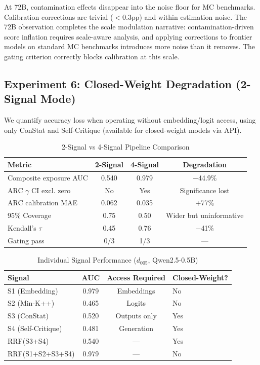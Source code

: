 \documentclass[11pt]{article}
\begin{document}
At 72B, contamination effects disappear into the noise floor for MC benchmarks. Calibration corrections are trivial ($< 0.3$pp) and within estimation noise. The 72B observation completes the scale modulation narrative: contamination-driven score inflation requires scale-aware analysis, and applying corrections to frontier models on standard MC benchmarks introduces more noise than it removes. The gating criterion correctly blocks calibration at this scale.

\subsection{Experiment 6: Closed-Weight Degradation (2-Signal Mode)}
\label{sec:closed}

We quantify accuracy loss when operating without embedding/logit access, using only ConStat and Self-Critique (available for closed-weight models via API).

\begin{table}[h]
\centering
\caption{2-Signal vs 4-Signal Pipeline Comparison}
\label{tab:2v4}
\begin{tabular}{lccc}
\toprule
Metric & 2-Signal & 4-Signal & Degradation \\
\midrule
Composite exposure AUC & 0.540 & 0.979 & $-$44.9\% \\
ARC $\gamma$ CI excl. zero & No & Yes & Significance lost \\
ARC calibration MAE & 0.062 & 0.035 & +77\% \\
95\% Coverage & 0.75 & 0.50 & Wider but uninformative \\
Kendall's $\tau$ & 0.45 & 0.76 & $-$41\% \\
Gating pass & 0/3 & 1/3 & --- \\
\bottomrule
\end{tabular}
\end{table}

\begin{table}[h]
\centering
\caption{Individual Signal Performance ($d_{005}$, Qwen2.5-0.5B)}
\label{tab:signals}
\begin{tabular}{lccl}
\toprule
Signal & AUC & Access Required & Closed-Weight? \\
\midrule
S1 (Embedding) & 0.979 & Embeddings & No \\
S2 (Min-K++) & 0.465 & Logits & No \\
S3 (ConStat) & 0.520 & Outputs only & Yes \\
S4 (Self-Critique) & 0.481 & Generation & Yes \\
RRF(S3+S4) & 0.540 & --- & Yes \\
RRF(S1+S2+S3+S4) & 0.979 & --- & No \\
\bottomrule
\end{tabular}
\end{table}
\end{document}
